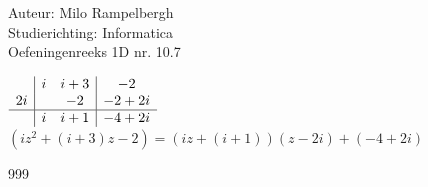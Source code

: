 \documentclass[a4paper]{article}
\begin{document}
\noindent \large Auteur: Milo Rampelbergh \\
\noindent \large Studierichting: Informatica\\
\noindent \large Oefeningenreeks 1D nr. 10.7\\

\medskip

\normalsize


$\begin{array}{c|cc|c}
& i & i+3 & -2 \\
2i && -2 & -2+2i \\
\hline
& i & i+1 & -4+2i \\
\end{array}$ \\

$ (iz^2 + (i+3)z - 2) = (iz + (i+1))(z-2i) + (-4+2i) $

\begin{thebibliography}{999}
\end{thebibliography}
\end{document}
